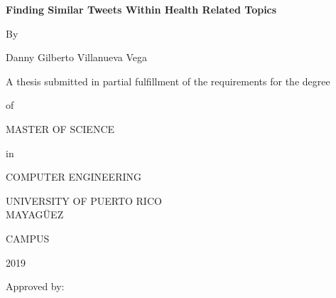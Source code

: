 \documentclass[12pt]{report}
\begin{document}
	\newtheorem{definition}{Example}
	
	\newtheorem{property}{Property}
	
	
	\begin{titlepage}
		\centering 
		{\LARGE \textbf {Finding Similar Tweets Within Health Related Topics}\par}
		\vspace{1cm}
		{By\par}
		{Danny Gilberto Villanueva Vega\par}    
		{A thesis submitted in partial fulfillment of the requirements for the degree \par}
		\vspace{.1cm}
		{of\par}
		\vspace{.1cm}
		{MASTER OF SCIENCE\par}
		{in\par}
		{COMPUTER ENGINEERING\par}
		{UNIVERSITY OF PUERTO RICO
			\\MAYAG\"UEZ}{  CAMPUS\par}
		{2019}
		\vspace{.1cm}
		\begin{flushleft}
			Approved by:\\
			\vspace{1cm}
		\end{flushleft}
		\begin{tabular}{l c c c c c r}
			

\end{tabular}
\end{titlepage}
\end{document}
